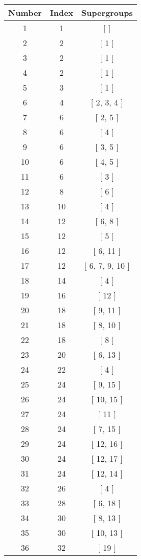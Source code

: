 \begin{center}
\begin{longtable}[H]{|| c c c ||}
\hline
Number &  Index &  Supergroups
\\\hline
1 & 1 & [  ]
\\\hline
2 & 2 & [ 1 ]
\\\hline
3 & 2 & [ 1 ]
\\\hline
4 & 2 & [ 1 ]
\\\hline
5 & 3 & [ 1 ]
\\\hline
6 & 4 & [ 2, 3, 4 ]
\\\hline
7 & 6 & [ 2, 5 ]
\\\hline
8 & 6 & [ 4 ]
\\\hline
9 & 6 & [ 3, 5 ]
\\\hline
10 & 6 & [ 4, 5 ]
\\\hline
11 & 6 & [ 3 ]
\\\hline
12 & 8 & [ 6 ]
\\\hline
13 & 10 & [ 4 ]
\\\hline
14 & 12 & [ 6, 8 ]
\\\hline
15 & 12 & [ 5 ]
\\\hline
16 & 12 & [ 6, 11 ]
\\\hline
17 & 12 & [ 6, 7, 9, 10 ]
\\\hline
18 & 14 & [ 4 ]
\\\hline
19 & 16 & [ 12 ]
\\\hline
20 & 18 & [ 9, 11 ]
\\\hline
21 & 18 & [ 8, 10 ]
\\\hline
22 & 18 & [ 8 ]
\\\hline
23 & 20 & [ 6, 13 ]
\\\hline
24 & 22 & [ 4 ]
\\\hline
25 & 24 & [ 9, 15 ]
\\\hline
26 & 24 & [ 10, 15 ]
\\\hline
27 & 24 & [ 11 ]
\\\hline
28 & 24 & [ 7, 15 ]
\\\hline
29 & 24 & [ 12, 16 ]
\\\hline
30 & 24 & [ 12, 17 ]
\\\hline
31 & 24 & [ 12, 14 ]
\\\hline
32 & 26 & [ 4 ]
\\\hline
33 & 28 & [ 6, 18 ]
\\\hline
34 & 30 & [ 8, 13 ]
\\\hline
35 & 30 & [ 10, 13 ]
\\\hline
36 & 32 & [ 19 ]
\\\hline

\end{longtable}
\end{center}
